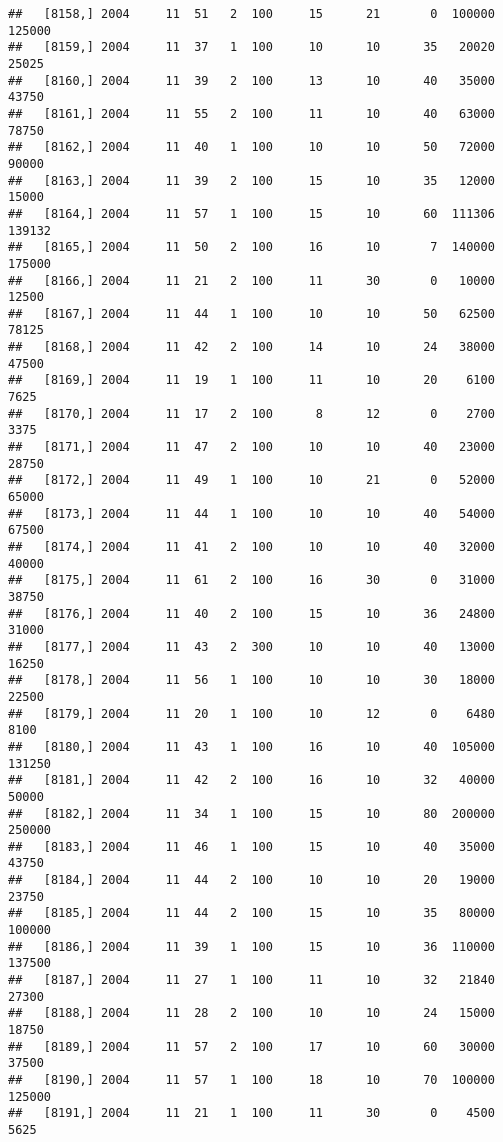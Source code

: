 \documentclass{article}\usepackage[]{graphicx}\usepackage[]{color}
\makeatletter
\newenvironment{kframe}{%
 \def\at@end@of@kframe{}%
 \ifinner\ifhmode%
  \def\at@end@of@kframe{\end{minipage}}%
  \begin{minipage}{\columnwidth}%
 \fi\fi%
 \def\FrameCommand##1{\hskip\@totalleftmargin \hskip-\fboxsep
 \colorbox{shadecolor}{##1}\hskip-\fboxsep
     \hskip-\linewidth \hskip-\@totalleftmargin \hskip\columnwidth}%
 \MakeFramed {\advance\hsize-\width
   \@totalleftmargin\z@ \linewidth\hsize
   \@setminipage}}%
 {\par\unskip\endMakeFramed%
 \at@end@of@kframe}
\newenvironment{knitrout}{}{} %
\makeatother
\begin{document}
\begin{knitrout}
\begin{kframe}
\begin{verbatim}
##   [8158,] 2004     11  51   2  100     15      21       0  100000  125000
##   [8159,] 2004     11  37   1  100     10      10      35   20020   25025
##   [8160,] 2004     11  39   2  100     13      10      40   35000   43750
##   [8161,] 2004     11  55   2  100     11      10      40   63000   78750
##   [8162,] 2004     11  40   1  100     10      10      50   72000   90000
##   [8163,] 2004     11  39   2  100     15      10      35   12000   15000
##   [8164,] 2004     11  57   1  100     15      10      60  111306  139132
##   [8165,] 2004     11  50   2  100     16      10       7  140000  175000
##   [8166,] 2004     11  21   2  100     11      30       0   10000   12500
##   [8167,] 2004     11  44   1  100     10      10      50   62500   78125
##   [8168,] 2004     11  42   2  100     14      10      24   38000   47500
##   [8169,] 2004     11  19   1  100     11      10      20    6100    7625
##   [8170,] 2004     11  17   2  100      8      12       0    2700    3375
##   [8171,] 2004     11  47   2  100     10      10      40   23000   28750
##   [8172,] 2004     11  49   1  100     10      21       0   52000   65000
##   [8173,] 2004     11  44   1  100     10      10      40   54000   67500
##   [8174,] 2004     11  41   2  100     10      10      40   32000   40000
##   [8175,] 2004     11  61   2  100     16      30       0   31000   38750
##   [8176,] 2004     11  40   2  100     15      10      36   24800   31000
##   [8177,] 2004     11  43   2  300     10      10      40   13000   16250
##   [8178,] 2004     11  56   1  100     10      10      30   18000   22500
##   [8179,] 2004     11  20   1  100     10      12       0    6480    8100
##   [8180,] 2004     11  43   1  100     16      10      40  105000  131250
##   [8181,] 2004     11  42   2  100     16      10      32   40000   50000
##   [8182,] 2004     11  34   1  100     15      10      80  200000  250000
##   [8183,] 2004     11  46   1  100     15      10      40   35000   43750
##   [8184,] 2004     11  44   2  100     10      10      20   19000   23750
##   [8185,] 2004     11  44   2  100     15      10      35   80000  100000
##   [8186,] 2004     11  39   1  100     15      10      36  110000  137500
##   [8187,] 2004     11  27   1  100     11      10      32   21840   27300
##   [8188,] 2004     11  28   2  100     10      10      24   15000   18750
##   [8189,] 2004     11  57   2  100     17      10      60   30000   37500
##   [8190,] 2004     11  57   1  100     18      10      70  100000  125000
##   [8191,] 2004     11  21   1  100     11      30       0    4500    5625

\end{verbatim}
\end{kframe}
\end{knitrout}
\end{document}
